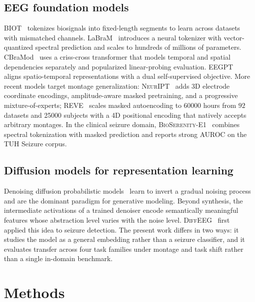 \documentclass[journal]{IEEEtran}
\begin{document}
\subsection{EEG foundation models}
BIOT~\cite{yang2024biot} tokenizes biosignals into fixed-length segments to
learn across datasets with mismatched channels. LaBraM~\cite{jiang2024labram}
introduces a neural tokenizer with vector-quantized spectral prediction and
scales to hundreds of millions of parameters.
CBraMod~\cite{wang2024cbramod} uses a criss-cross transformer that models
temporal and spatial dependencies separately and popularized linear-probing
evaluation. EEGPT~\cite{wang2024eegpt} aligns spatio-temporal representations
with a dual self-supervised objective. More recent models target montage
generalization: \textsc{NeurIPT}~\cite{fang2025neuript} adds 3D electrode
coordinate encodings, amplitude-aware masked pretraining, and a progressive
mixture-of-experts; \textsc{REVE}~\cite{elouahidi2025reve} scales masked
autoencoding to \num{60000} hours from $92$ datasets and \num{25000} subjects
with a 4D positional encoding that natively accepts arbitrary montages. In the
clinical seizure domain, \textsc{BioSerenity-E1}~\cite{bettinardi2025bioserenity}
combines spectral tokenization with masked prediction and reports strong AUROC
on the TUH Seizure corpus.

\subsection{Diffusion models for representation learning}
Denoising diffusion probabilistic models~\cite{ho2020ddpm,nichol2021improved}
learn to invert a gradual noising process and are the dominant paradigm for
generative modeling. Beyond synthesis, the intermediate activations of a trained
denoiser encode semantically meaningful features whose abstraction level varies
with the noise level. \textsc{DiffEEG}~\cite{helwan2025diffeeg} first applied
this idea to seizure detection. The present work differs in two ways: it studies
the model as a general embedding rather than a seizure classifier, and it
evaluates transfer across four task families under montage and task shift rather
than a single in-domain benchmark.

\section{Methods}
\end{document}
